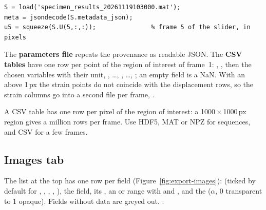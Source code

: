 \begin{lstlisting}
S = load('specimen_results_20261119103000.mat');
meta = jsondecode(S.metadata_json);
u5 = squeeze(S.U(5,:,:));               % frame 5 of the slider, in pixels
\end{lstlisting}

The \textbf{parameters file} repeats the provenance as readable JSON. The \textbf{CSV tables} have
one row per point of the region of interest of frame~1: , , then the
chosen variables with their unit, , \ldots, , \ldots,
; an empty field is a NaN. With an  above 1\,px the strain
points do not coincide with the displacement rows, so the strain columns go into a second file per
frame, .

\begin{warnbox}
A CSV table has one row per pixel of the region of interest: a 1000\,$\times$\,1000\,px region gives
a million rows per frame. Use HDF5, MAT or NPZ for sequences, and CSV for a few frames.
\end{warnbox}

\subsection{Images tab}


The list at the top has one row per field (Figure~\ref{fig:export-images}):  (ticked by
default for , , , , ), the field, its , an
 or  range with  and , and the  ($\alpha$, 0
transparent to 1 opaque). Fields without data are greyed out. :

